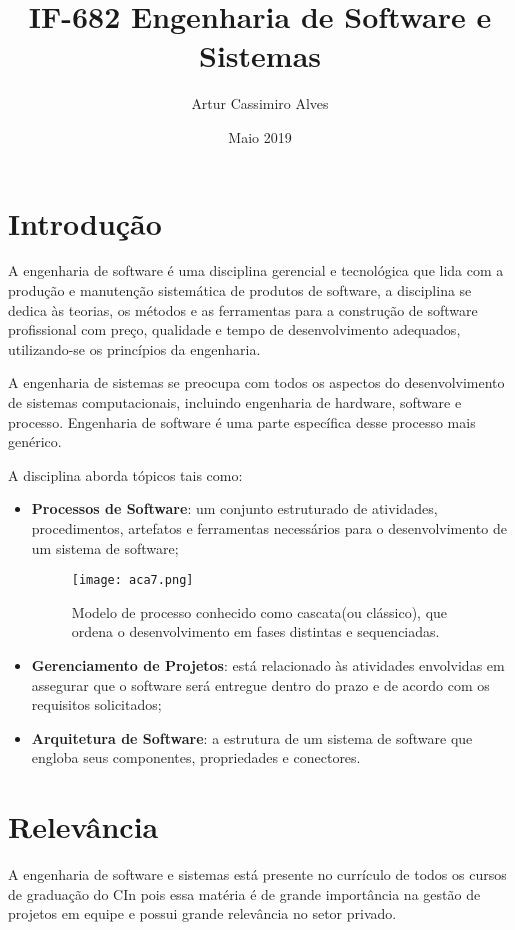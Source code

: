 \documentclass[10pt]{article}
\title{IF-682 Engenharia de Software e Sistemas}
\author{Artur Cassimiro Alves}
\date{Maio 2019}
\begin{document}
\maketitle

\section{Introdução}
A engenharia de software é uma disciplina gerencial e tecnológica que lida com a produção e manutenção sistemática de produtos de software, a disciplina se dedica às teorias, os métodos e as ferramentas para a construção de software profissional com preço, qualidade e tempo de desenvolvimento adequados, utilizando-se os princípios da engenharia.\citep{IntES}

A engenharia de sistemas se preocupa com todos os aspectos do desenvolvimento de sistemas computacionais, incluindo engenharia de hardware, software e processo. Engenharia de software é uma parte específica desse processo mais genérico.\citep{SommervilleES2011}

A disciplina aborda tópicos tais como:

\begin{itemize}
    \item \textbf{Processos de Software}: um conjunto estruturado de atividades, procedimentos, artefatos e ferramentas necessários para o desenvolvimento de um sistema de software;\citep{ProcessosSoftware}
        \begin{figure}[h!]
        \centering
        \texttt{[image: aca7.png]}
        \caption{Modelo de processo conhecido como cascata(ou clássico), que ordena o desenvolvimento em fases distintas e sequenciadas.}
        \label{fig:aca7}
        \end{figure}
    
    \item \textbf{Gerenciamento de Projetos}: está relacionado às atividades envolvidas em assegurar que o software será entregue dentro do prazo e de acordo com os requisitos solicitados;\citep{GerenciamentoProjetos}
    
    \item \textbf{Arquitetura de Software}: a estrutura de um sistema de software que engloba seus componentes, propriedades e conectores.\citep{ArquiteturaSoftware}
    
\end{itemize}

\section{Relevância}
A engenharia de software e sistemas está presente no currículo de todos os cursos de graduação do CIn pois essa matéria é de grande importância na gestão de projetos em equipe e possui grande relevância no setor privado.
\end{document}
